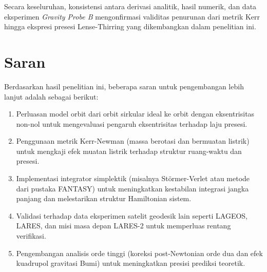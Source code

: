 Secara keseluruhan, konsistensi antara derivasi analitik,
hasil numerik, dan data eksperimen \textit{Gravity Probe B}
mengonfirmasi validitas penurunan dari metrik Kerr
hingga ekspresi presesi Lense-Thirring
yang dikembangkan dalam penelitian ini.


\section{Saran}
\label{sec:saran}

Berdasarkan hasil penelitian ini, beberapa saran
untuk pengembangan lebih lanjut adalah sebagai berikut:

\begin{enumerate}
    \item Perluasan model orbit dari orbit sirkular ideal
          ke orbit dengan eksentrisitas non-nol
          untuk mengevaluasi pengaruh eksentrisitas
          terhadap laju presesi.

    \item Penggunaan metrik Kerr-Newman
          (massa berotasi dan bermuatan listrik)
          untuk mengkaji efek muatan listrik
          terhadap struktur ruang-waktu dan presesi.

    \item Implementasi integrator simplektik
          (misalnya Störmer-Verlet atau metode dari pustaka FANTASY)
          untuk meningkatkan kestabilan integrasi jangka panjang
          dan melestarikan struktur Hamiltonian sistem.

    \item Validasi terhadap data eksperimen satelit geodesik lain
          seperti LAGEOS, LARES, dan misi masa depan LARES-2
          untuk memperluas rentang verifikasi.

    \item Pengembangan analisis orde tinggi
          (koreksi post-Newtonian orde dua dan efek kuadrupol gravitasi Bumi)
          untuk meningkatkan presisi prediksi teoretik.
\end{enumerate}
